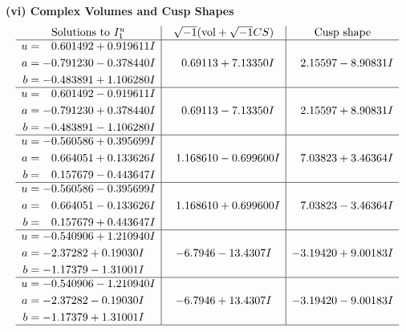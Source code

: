 \documentclass[1p]{elsarticle_modified}
\theoremstyle{definition}
\newcommand{\I}{\sqrt{-1}}
\begin{document}
\newpage\flushleft \textbf{(vi) Complex Volumes and Cusp Shapes}
$$\begin{array}{c|c|c}  
\text{Solutions to }I^u_{1}& \I (\text{vol} + \sqrt{-1}CS) & \text{Cusp shape}\\
 \hline 
\begin{aligned}
u &= \phantom{-}0.601492 + 0.919611 I \\
a &= -0.791230 - 0.378440 I \\
b &= -0.483891 + 1.106280 I\end{aligned}
 & \phantom{-}0.69113 + 7.13350 I & \phantom{-}2.15597 - 8.90831 I \\ \hline\begin{aligned}
u &= \phantom{-}0.601492 - 0.919611 I \\
a &= -0.791230 + 0.378440 I \\
b &= -0.483891 - 1.106280 I\end{aligned}
 & \phantom{-}0.69113 - 7.13350 I & \phantom{-}2.15597 + 8.90831 I \\ \hline\begin{aligned}
u &= -0.560586 + 0.395699 I \\
a &= \phantom{-}0.664051 + 0.133626 I \\
b &= \phantom{-}0.157679 - 0.443647 I\end{aligned}
 & \phantom{-}1.168610 - 0.699600 I & \phantom{-}7.03823 + 3.46364 I \\ \hline\begin{aligned}
u &= -0.560586 - 0.395699 I \\
a &= \phantom{-}0.664051 - 0.133626 I \\
b &= \phantom{-}0.157679 + 0.443647 I\end{aligned}
 & \phantom{-}1.168610 + 0.699600 I & \phantom{-}7.03823 - 3.46364 I \\ \hline\begin{aligned}
u &= -0.540906 + 1.210940 I \\
a &= -2.37282 + 0.19030 I \\
b &= -1.17379 - 1.31001 I\end{aligned}
 & -6.7946 - 13.4307 I & -3.19420 + 9.00183 I \\ \hline\begin{aligned}
u &= -0.540906 - 1.210940 I \\
a &= -2.37282 - 0.19030 I \\
b &= -1.17379 + 1.31001 I\end{aligned}
 & -6.7946 + 13.4307 I & -3.19420 - 9.00183 I\\
 \hline 
 \end{array}$$\newpage\newpage\renewcommand{\arraystretch}{1}
\end{document}
